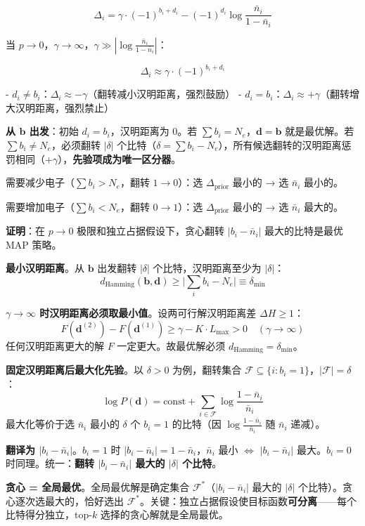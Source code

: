 \documentclass[11pt,a4paper]{article}
\begin{document}
$$\boxed{\Delta_i = \gamma \cdot (-1)^{b_i + d_i} - (-1)^{d_i} \log\frac{\bar{n}_i}{1-\bar{n}_i}}$$

当 $p \to 0$，$\gamma \to \infty$，$\gamma \gg |\log\frac{\bar{n}_i}{1-\bar{n}_i}|$：

$$\Delta_i \approx \gamma \cdot (-1)^{b_i + d_i}$$

- $d_i \neq b_i$：$\Delta_i \approx -\gamma$（翻转减小汉明距离，强烈鼓励）
- $d_i = b_i$：$\Delta_i \approx +\gamma$（翻转增大汉明距离，强烈禁止）

\textbf{从 $\mathbf{b}$ 出发}：初始 $d_i = b_i$，汉明距离为 0。若 $\sum b_i = N_e$，$\mathbf{d} = \mathbf{b}$ 就是最优解。若 $\sum b_i \neq N_e$，必须翻转 $|\delta|$ 个比特（$\delta = \sum b_i - N_e$），所有候选翻转的汉明距离惩罚相同（$+\gamma$），\textbf{先验项成为唯一区分器}。


需要减少电子（$\sum b_i > N_e$，翻转 $1 \to 0$）：选 $\Delta_{\text{prior}}$ 最小的 → 选 $\bar{n}_i$ 最小的。

需要增加电子（$\sum b_i < N_e$，翻转 $0 \to 1$）：选 $\Delta_{\text{prior}}$ 最小的 → 选 $\bar{n}_i$ 最大的。


\textbf{证明}：在 $p \to 0$ 极限和独立占据假设下，贪心翻转 $|b_i - \bar{n}_i|$ 最大的比特是最优 MAP 策略。

\textbf{最小汉明距离}。从 $\mathbf{b}$ 出发翻转 $|\delta|$ 个比特，汉明距离至少为 $|\delta|$：
$$d_{\text{Hamming}}(\mathbf{b}, \mathbf{d}) \geq \big|\sum_i b_i - N_e\big| \equiv \delta_{\min}$$

\textbf{$\gamma \to \infty$ 时汉明距离必须取最小值}。设两可行解汉明距离差 $\Delta H \geq 1$：
$$F(\mathbf{d}^{(2)}) - F(\mathbf{d}^{(1)}) \geq \gamma - K \cdot L_{\max} > 0 \quad (\gamma \to \infty)$$
任何汉明距离更大的解 $F$ 一定更大。故最优解必须 $d_{\text{Hamming}} = \delta_{\min}$。

\textbf{固定汉明距离后最大化先验}。以 $\delta > 0$ 为例，翻转集合 $\mathcal{F} \subseteq \{i: b_i = 1\}$，$|\mathcal{F}| = \delta$：
$$\log P(\mathbf{d}) = \text{const} + \sum_{i \in \mathcal{F}} \log\frac{1-\bar{n}_i}{\bar{n}_i}$$
最大化等价于选 $\bar{n}_i$ 最小的 $\delta$ 个 $b_i=1$ 的比特（因 $\log\frac{1-\bar{n}_i}{\bar{n}_i}$ 随 $\bar{n}_i$ 递减）。

\textbf{翻译为 $|b_i - \bar{n}_i|$}。$b_i=1$ 时 $|b_i - \bar{n}_i| = 1-\bar{n}_i$，$\bar{n}_i$ 最小 $\Leftrightarrow$ $|b_i - \bar{n}_i|$ 最大。$b_i=0$ 时同理。统一：\textbf{翻转 $|b_i - \bar{n}_i|$ 最大的 $|\delta|$ 个比特}。

\textbf{贪心 = 全局最优}。全局最优解是确定集合 $\mathcal{F}^*$（$|b_i - \bar{n}_i|$ 最大的 $|\delta|$ 个比特）。贪心逐次选最大的，恰好选出 $\mathcal{F}^*$。关键：独立占据假设使目标函数\textbf{可分离}——每个比特得分独立，top-$k$ 选择的贪心解就是全局最优。
\end{document}

